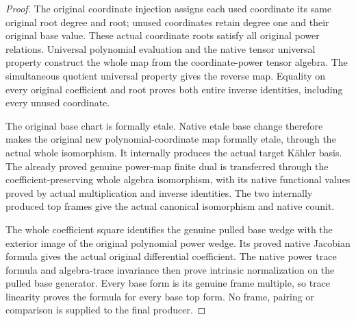 \begin{proof}
The original coordinate injection assigns each used coordinate its
same original root degree and root; unused coordinates retain degree
one and their original base value.  These actual coordinate roots
satisfy all original power relations.  Universal polynomial evaluation
and the native tensor universal property construct the whole map from
the coordinate-power tensor algebra.  The simultaneous quotient
universal property gives the reverse map.  Equality on every original
coefficient and root proves both entire inverse identities, including
every unused coordinate.

The original base chart is formally etale.  Native etale base change
therefore makes the original new polynomial-coordinate map formally
etale, through the actual whole isomorphism.  It internally produces
the actual target K\"ahler basis.  The already proved genuine power-map
finite dual is transferred through the coefficient-preserving whole
algebra isomorphism, with its native functional values proved by actual
multiplication and inverse identities.  The two internally produced
top frames give the actual canonical isomorphism and native counit.

The whole coefficient square identifies the genuine pulled base wedge
with the exterior image of the original polynomial power wedge.  Its
proved native Jacobian formula gives the actual original differential
coefficient.  The native power trace formula and algebra-trace invariance
then prove intrinsic normalization on the pulled base generator.
Every base form is its genuine frame multiple, so trace linearity
proves the formula for every base top form.  No frame, pairing or
comparison is supplied to the final producer.
\end{proof}

